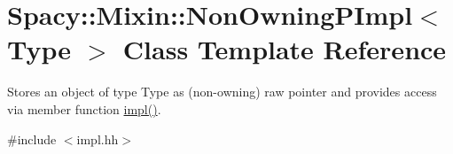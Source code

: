 \hypertarget{classSpacy_1_1Mixin_1_1NonOwningPImpl}{}\section{Spacy\+:\+:Mixin\+:\+:Non\+Owning\+P\+Impl$<$ Type $>$ Class Template Reference}
\label{classSpacy_1_1Mixin_1_1NonOwningPImpl}


Stores an object of type Type as (non-\/owning) raw pointer and provides access via member function \hyperlink{classSpacy_1_1Mixin_1_1NonOwningPImpl_aeeb3e0a5f6fd8f22633040dcf94355f9}{impl()}.  




{\ttfamily \#include $<$impl.\+hh$>$}


